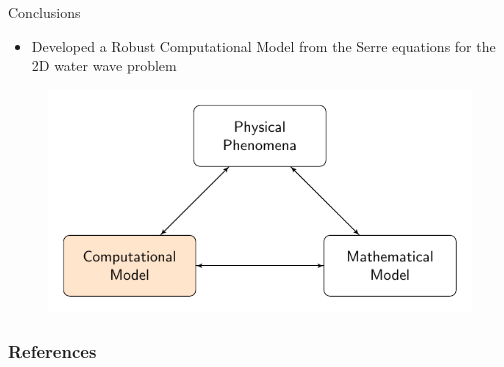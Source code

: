 \documentclass[handout]{beamer}
\begin{document}
\begin{frame}{Conclusions}
	\begin{itemize}
		\item Developed a Robust Computational Model from the Serre equations for the 2D water wave problem
	\end{itemize}
	\begin{figure}
		\includegraphics[width=\textwidth]{./Pics/ModelDiagrams/FlowChartHigh3O.pdf}
	\end{figure}
\end{frame}

\begin{frame}[allowframebreaks]
	\frametitle{References}
	
	
\end{frame}
\end{document}
